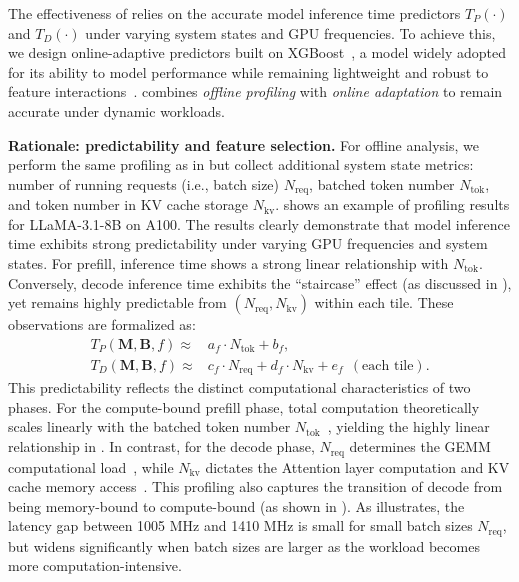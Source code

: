 The effectiveness of \governor relies on the accurate model inference time predictors $T_P(\cdot)$ and $T_D(\cdot)$ under varying system states and GPU frequencies.
To achieve this, we design online-adaptive predictors \predictor built on XGBoost~\cite{chen2016xgboost}, a model widely adopted for its ability to model performance while remaining lightweight and robust to feature interactions~\cite{chen2018tvm,chen2018learning}.
\predictor combines \emph{offline profiling} with \emph{online adaptation} to remain accurate under dynamic workloads.

\noindent
\textbf{Rationale: predictability and feature selection.}
For offline analysis, we perform the same profiling as in  but collect additional system state metrics: number of running requests (i.e., batch size) $N_{\text{req}}$, batched token number $N_{\text{tok}}$, and token number in KV cache storage $N_{\text{kv}}$.
 shows an example of profiling results for LLaMA-3.1-8B on A100.
The results clearly demonstrate that model inference time exhibits strong predictability under varying GPU frequencies and system states.
For prefill, inference time shows a strong linear relationship with $N_{\text{tok}}$. Conversely, decode inference time exhibits the ``staircase'' effect (as discussed in ), yet remains highly predictable from $(N_{\text{req}}, N_{\text{kv}})$ within each tile.
These observations are formalized as:
\begin{align}
    T_P \left(\mathbf{M}, \mathbf{B}, f \right) \approx & a_f \cdot N_{\text{tok}} + b_f, \label{eq:pred-ttft} \\
    T_D \left( \mathbf{M}, \mathbf{B}, f  \right)  \approx & c_f \cdot N_{\text{req}} + d_f \cdot N_{\text{kv}} + e_f\ \ (\text{each tile}). \label{eq:pred-itl}
\end{align}
This predictability reflects the distinct computational characteristics of two phases.
For the compute-bound prefill phase, total computation theoretically scales linearly with the batched token number $N_{\text{tok}}$~\cite{vaswani2017attention,dao2023flashattention2}, yielding the highly linear relationship in .
In contrast, for the decode phase, $N_{\text{req}}$ determines the GEMM computational load~\cite{vaswani2017attention}, while $N_{\text{kv}}$ dictates the Attention layer computation and KV cache memory access~\cite{dao2023flashattention2}.
This profiling also captures the transition of decode from being memory-bound to compute-bound (as shown in ).
As  illustrates, the latency gap between 1005 MHz and 1410 MHz is small for small batch sizes $N_{\text{req}}$, but widens significantly when batch sizes are larger as the workload becomes more computation-intensive.

